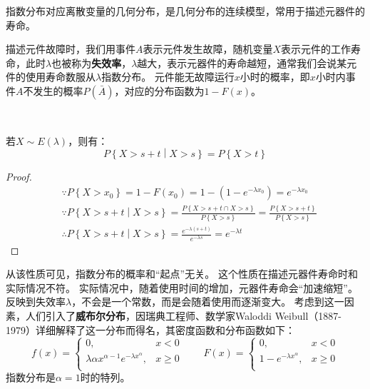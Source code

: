 \begin{tcolorbox}
指数分布对应离散变量的几何分布，是几何分布的连续模型，常用于描述元器件的寿命。
\end{tcolorbox}

描述元件故障时，我们用事件$A$表示元件发生故障，随机变量$X$表示元件的工作寿命，此时$\lambda $也被称为{\bf 失效率}，$\lambda $越大，表示元器件的寿命越短，通常我们会说某元件的使用寿命数服从$\lambda $指数分布。
元件能无故障运行$x$小时的概率，即$x$小时内事件$A$不发生的概率$P\left( \bar{A} \right) $，对应的分布函数为$1-F\left( x \right) $。

~

\begin{theorem}
若$X\sim E\left( \lambda \right) $，则有：
\[
P\left\{ X>s+t \middle| X>s \right\} =P\left\{ X>t \right\}
\]
\end{theorem}

\begin{proof}
\begin{align*}
&\because P\left\{ X>x_0 \right\} =1-F\left( x_0 \right) =1-\left( 1-e^{-\lambda x_0} \right) =e^{-\lambda x_0} \\
&\because P\left\{ X>s+t \middle| X>s \right\} =\frac{P\left\{ X>s+t\cap X>s \right\}}{P\left\{ X>s \right\}}=\frac{P\left\{ X>s+t \right\}}{P\left\{ X>s \right\}} \\
&\therefore P\left\{ X>s+t \middle| X>s \right\} =\frac{e^{-\lambda \left( s+t \right)}}{e^{-\lambda s}}=e^{-\lambda t}
\end{align*}
\end{proof}

从该性质可见，指数分布的概率和“起点”无关。
这个性质在描述元器件寿命时和实际情况不符。
实际情况中，随着使用时间的增加，元器件寿命会“加速缩短”。
反映到失效率$\lambda $，不会是一个常数，而是会随着使用而逐渐变大。
考虑到这一因素，人们引入了{\bf 威布尔分布}，因瑞典工程师、数学家Waloddi Weibull（1887-1979）详细解释了这一分布而得名，其密度函数和分布函数如下：
\[
f\left( x \right) =\begin{cases}
	0,&		x<0\\
	\lambda \alpha x^{\alpha -1}e^{-\lambda x^{\alpha}},&		x\geqslant 0\\
\end{cases}\qquad F\left( x \right) =\begin{cases}
	0,&		x<0\\
	1-e^{-\lambda x^{\alpha}},&		x\geqslant 0\\
\end{cases}
\]
指数分布是$\alpha =1$时的特列。

